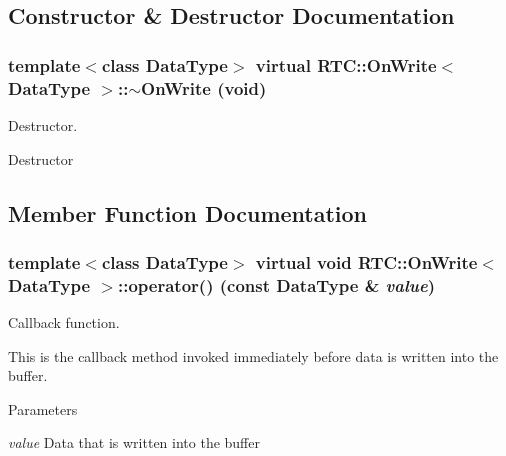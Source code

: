 \subsection{Constructor \& Destructor Documentation}
\subsubsection[{$\sim$OnWrite}]{\setlength{\rightskip}{0pt plus 5cm}template$<$class DataType$>$ virtual {\bf RTC::OnWrite}$<$ DataType $>$::$\sim${\bf OnWrite} (void)\hspace{0.3cm}{\ttfamily  [inline, virtual]}}\label{classRTC_1_1OnWrite_a2d933024e730be0535ecf38efe40aede}


Destructor. 

Destructor 

\subsection{Member Function Documentation}
\subsubsection[{operator()}]{\setlength{\rightskip}{0pt plus 5cm}template$<$class DataType$>$ virtual void {\bf RTC::OnWrite}$<$ DataType $>$::operator() (const DataType \& {\em value})\hspace{0.3cm}{\ttfamily  [pure virtual]}}\label{classRTC_1_1OnWrite_a21dbf5431532045a4c953d7c8ed09777}


Callback function. 

This is the callback method invoked immediately before data is written into the buffer.


\begin{DoxyParams}{Parameters}
\item[{\em value}]Data that is written into the buffer \end{DoxyParams}
